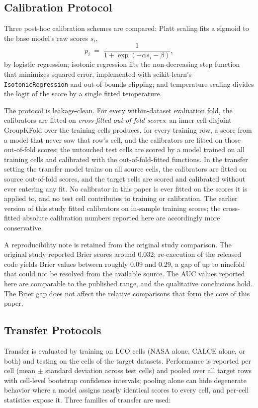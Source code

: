 \documentclass[IJPHM, 2014, 00]{PHMSociety}
\begin{document}
\subsection{Calibration Protocol}
Three post-hoc calibration schemes are compared: Platt scaling fits a sigmoid to the base model's raw scores $s_i$,
\begin{equation}\label{eq:platt}
p_i \;=\; \frac{1}{1+\exp(-\alpha s_i - \beta)},
\end{equation}
by logistic regression; isotonic regression \cite{zadrozny2002transforming} fits the non-decreasing step function that minimizes squared error, implemented with scikit-learn's \texttt{IsotonicRegression} and out-of-bounds clipping; and temperature scaling divides the logit of the score by a single fitted temperature.

The protocol is leakage-clean. For every within-dataset evaluation fold, the calibrators are fitted on \emph{cross-fitted out-of-fold scores}: an inner cell-disjoint GroupKFold over the training cells produces, for every training row, a score from a model that never saw that row's cell, and the calibrators are fitted on those out-of-fold scores; the untouched test cells are scored by a model trained on all training cells and calibrated with the out-of-fold-fitted functions. In the transfer setting the transfer model trains on all source cells, the calibrators are fitted on source out-of-fold scores, and the target cells are scored and calibrated without ever entering any fit. No calibrator in this paper is ever fitted on the scores it is applied to, and no test cell contributes to training or calibration. The earlier version of this study fitted calibrators on in-sample training scores; the cross-fitted absolute calibration numbers reported here are accordingly more conservative.

A reproducibility note is retained from the original study comparison. The original study \cite{shikdar2026learning} reported Brier scores around 0.032; re-execution of the released code yields Brier values between roughly 0.09 and 0.29, a gap of up to ninefold that could not be resolved from the available source. The AUC values reported here are comparable to the published range, and the qualitative conclusions hold. The Brier gap does not affect the relative comparisons that form the core of this paper.

\subsection{Transfer Protocols}
Transfer is evaluated by training on LCO cells (NASA alone, CALCE alone, or both) and testing on the cells of the target datasets. Performance is reported per cell (mean $\pm$ standard deviation across test cells) and pooled over all target rows with cell-level bootstrap confidence intervals; pooling alone can hide degenerate behavior where a model assigns nearly identical scores to every cell, and per-cell statistics expose it. Three families of transfer are used:
\end{document}
